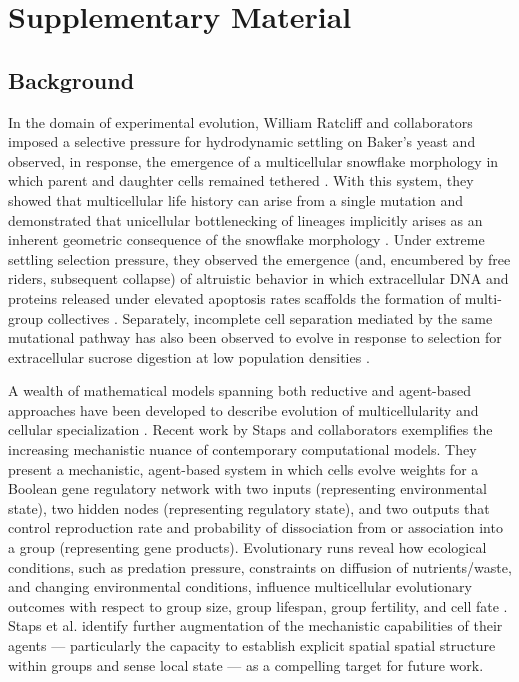 \section{Supplementary Material}

\subsection{Background} \label{sup:background}

In the domain of experimental evolution, William Ratcliff and collaborators imposed a selective pressure for hydrodynamic settling on Baker's yeast and observed, in response, the emergence of a multicellular snowflake morphology in which parent and daughter cells remained tethered \citep{ratcliff2014experimental}.
With this system, they showed that multicellular life history can arise from a single mutation and demonstrated that unicellular bottlenecking of lineages implicitly arises as an inherent geometric consequence of the snowflake morphology \citep{ratcliff2015origins}.
Under extreme settling selection pressure, they observed the emergence (and, encumbered by free riders, subsequent collapse) of altruistic behavior in which extracellular DNA and proteins released under elevated apoptosis rates scaffolds the formation of multi-group collectives \citep{gulli2019evolution}.
Separately, incomplete cell separation mediated by the same mutational pathway has also been observed to evolve in response to selection for extracellular sucrose digestion at low population densities \citep{koschwanez2013improved}.

A wealth of mathematical models spanning both reductive and agent-based approaches have been developed to describe evolution of multicellularity and cellular specialization \cite{hanschen2015evolutionary}.
Recent work by Staps and collaborators exemplifies the increasing mechanistic nuance of contemporary computational models.
They present a mechanistic, agent-based system in which cells evolve weights for a Boolean gene regulatory network with two inputs (representing environmental state), two hidden nodes (representing regulatory state), and two outputs that control reproduction rate and probability of dissociation from or association into a group (representing gene products).
Evolutionary runs reveal how ecological conditions, such as predation pressure, constraints on diffusion of nutrients/waste, and changing environmental conditions, influence multicellular evolutionary outcomes with respect to group size, group lifespan, group fertility, and cell fate \citep{staps2019emergence}.
Staps et al. identify further augmentation of the mechanistic capabilities of their agents --- particularly the capacity to establish explicit spatial spatial structure within groups and sense local state --- as a compelling target for future work.

